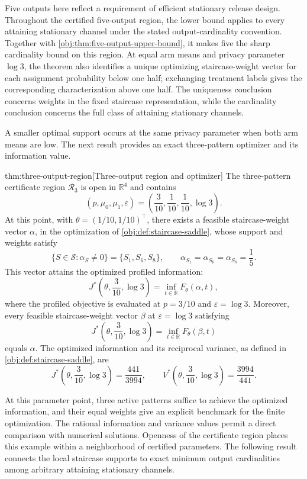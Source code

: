 Five outputs here reflect a requirement of efficient stationary release design. Throughout the certified five-output region, the lower bound applies to every attaining stationary channel under the stated output-cardinality convention. Together with \cref{obj:thm:five-output-upper-bound}, it makes five the sharp cardinality bound on this region. At equal arm means and privacy parameter \(\log 3\), the theorem also identifies a unique optimizing staircase-weight vector for each assignment probability below one half; exchanging treatment labels gives the corresponding characterization above one half. The uniqueness conclusion concerns weights in the fixed staircase representation, while the cardinality conclusion concerns the full class of attaining stationary channels.

A smaller optimal support occurs at the same privacy parameter when both arm means are low. The next result provides an exact three-pattern optimizer and its information value.

\begin{theoremv}{thm:three-output-region}[Three-output region and optimizer]
The three-pattern certificate region \(\mathcal R_3\) is open in \(\mathbb R^4\) and contains
\[
(p,\mu_0,\mu_1,\varepsilon)
=\left(\frac{3}{10},\frac{1}{10},\frac{1}{10},\log 3\right).
\]
At this point, with \(\theta=(1/10,1/10)^\top\), there exists a feasible staircase-weight vector \(\alpha\), in the optimization of \cref{obj:def:staircase-saddle}, whose support and weights satisfy
\[
\{S\in\mathcal S:\alpha_S\ne0\}=\{S_1,S_6,S_8\},
\qquad
\alpha_{S_1}=\alpha_{S_6}=\alpha_{S_8}=\frac15.
\]
This vector attains the optimized profiled information:
\[
J^*\left(\theta,\frac{3}{10},\log 3\right)
=\inf_{t\in\mathbb R}F_\theta(\alpha,t),
\]
where the profiled objective is evaluated at \(p=3/10\) and \(\varepsilon=\log 3\). Moreover, every feasible staircase-weight vector \(\beta\) at \(\varepsilon=\log 3\) satisfying
\[
J^*\left(\theta,\frac{3}{10},\log 3\right)
=\inf_{t\in\mathbb R}F_\theta(\beta,t)
\]
equals \(\alpha\). The optimized information and its reciprocal variance, as defined in \cref{obj:def:staircase-saddle}, are
\[
J^*\left(\theta,\frac{3}{10},\log 3\right)=\frac{441}{3994},
\qquad
V^*\left(\theta,\frac{3}{10},\log 3\right)=\frac{3994}{441}.
\]
\end{theoremv}

At this parameter point, three active patterns suffice to achieve the optimized information, and their equal weights give an explicit benchmark for the finite optimization. The rational information and variance values permit a direct comparison with numerical solutions. Openness of the certificate region places this example within a neighborhood of certified parameters. The following result connects the local staircase supports to exact minimum output cardinalities among arbitrary attaining stationary channels.

